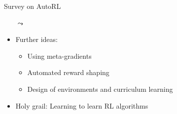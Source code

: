 \documentclass[aspectratio=169]{../latex_main/tntbeamer}  %
\begin{document}
\begin{frame}[c]{Survey on AutoRL}

\begin{itemize}
    \item[$\leadsto$]  
    \item Further ideas:
    \begin{itemize}
        \item Using meta-gradients
        \item Automated reward shaping
        \item Design of environments and curriculum learning
    \end{itemize}
    \item Holy grail: Learning to learn RL algorithms
\end{itemize}

\end{frame}

\end{document}
